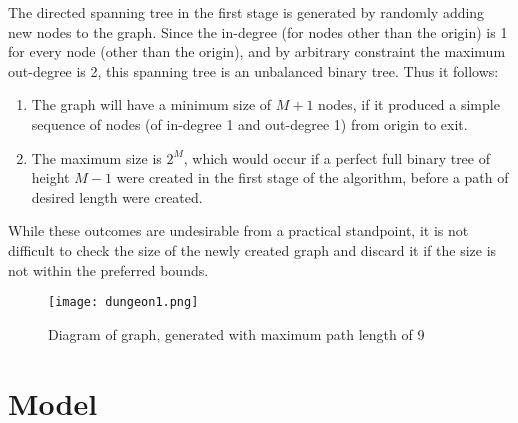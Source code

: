 \documentclass[landscape, a0, final]{a0poster}
\begin{document}
\begin{minipage}{0.50\linewidth}
\begin{minipage}[t]{0.50\linewidth}
\begin{minipage}[t]{0.9\linewidth}
The directed spanning tree in the first stage is generated by randomly adding new nodes to the graph.  Since the in-degree (for nodes other than the origin) is 1 for every node (other than the origin), and by arbitrary constraint the maximum out-degree is 2, this spanning tree is an unbalanced binary tree.  Thus it follows: 
    \begin{enumerate} 
        \item The graph will have a minimum size of $M + 1$ nodes, if it produced a simple sequence of nodes (of in-degree 1 and out-degree 1) from origin to exit.  
        \item The maximum size is $2^{M}$, which would occur if a perfect full binary tree of height $M - 1$ were created in the first stage of the algorithm, before a path of desired length were created.  
    \end{enumerate} 
While these outcomes are undesirable from a practical standpoint, it is not difficult to check the size of the newly created graph and discard it if the size is not within the preferred bounds.

\centering 
        \begin{figure}[H]
            \centering
            \texttt{[image: dungeon1.png]} 
            \caption{Diagram of graph, generated with maximum path length of 9} 
            \label{graph8}
        \end{figure}

\end{minipage} %
\end{minipage} %
\begin{minipage}[t]{0.50\linewidth} %
\centering 
    \begin{minipage}[t]{0.9\linewidth} %
\section{Model}


\end{minipage}
\end{minipage}
\end{minipage}
\end{document}
